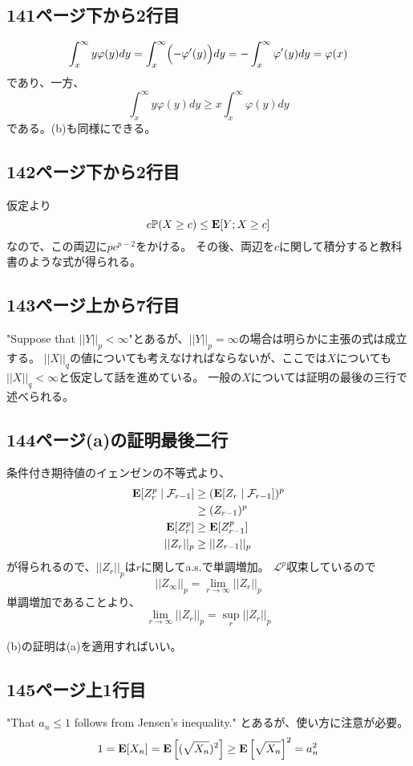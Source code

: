   \subsection{141ページ下から2行目}
    \[
      \int_x^{\infty}y\varphi(y) dy = \int_x^{\infty}\Bigl(-\varphi^{\prime}(y)\Bigl) dy = - \int_x^{\infty}\varphi^{\prime}(y) dy =\varphi(x)
    \]
    であり、一方、
    \[
      \int_x^{\infty}y\varphi(y) dy \ge x\int_x^{\infty}\varphi(y) dy
    \]
    である。(b)も同様にできる。

  \subsection{142ページ下から2行目}
    仮定より
    \[
      c{\mathbb{P}}(X\ge c) \leq {\mathbf{E}}[Y;X\ge c]
    \]
    なので、この両辺に$pc^{p-2}$をかける。
    その後、両辺を$c$に関して積分すると教科書のような式が得られる。

  \subsection{143ページ上から7行目}
    "Suppose that $||Y||_p < \infty$"とあるが、$||Y||_p = \infty$の場合は明らかに主張の式は成立する。
    $||X||_q$の値についても考えなければならないが、ここでは$X$についても
    $||X||_q < \infty$と仮定して話を進めている。
    一般の$X$については証明の最後の三行で述べられる。

  \subsection{144ページ(a)の証明最後二行}
    条件付き期待値のイェンゼンの不等式より、
    \begin{align*}
      {\mathbf{E}}[Z_r^p \mid \mathcal{F}_{r-1}] &\ge ({\mathbf{E}}[Z_r \mid \mathcal{F}_{r-1}])^p\\
      &\ge (Z_{r-1})^p\\
      {\mathbf{E}}[Z_r^p] &\ge {\mathbf{E}}[Z_{r-1}^p]\\
      ||Z_r||_p &\ge ||Z_{r-1}||_p
    \end{align*}
    が得られるので、$||Z_r||_p$は$r$に関してa.s.で単調増加。
    $\mathcal{L}^p$収束しているので
    \[
      ||Z_{\infty}||_p = \lim_{r \to \infty}||Z_r||_p
    \]
    単調増加であることより、
    \[
      \lim_{r \to \infty}||Z_r||_p = \sup_r ||Z_r||_p
    \]

    (b)の証明は(a)を適用すればいい。

  \subsection{145ページ上1行目}
    "That $a_n \leq 1 $ follows from Jensen's inequality."
    とあるが、使い方に注意が必要。
    \[
      1 = {\mathbf{E}}[X_n] = {\mathbf{E}} \left[(\sqrt{X_n})^2 \right] \ge {\mathbf{E}} \left[\sqrt{X_n} \right]^2 = a_n^2
    \]

